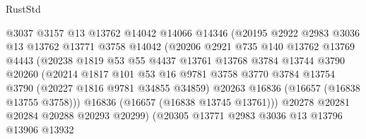 \begin{lexlean}{RustStd}
\begin{coremodule}
                            @3037
                            @3157
                            @13
                            @13762
                            @14042
                            @14066
                            @14346
                            (@20195
                              @2922
                              @2983
                              @3036
                              @13
                              @13762
                              @13771
                              @3758
                              @14042
                              (@20206
                                @2921
                                @735
                                @140
                                @13762
                                @13769
                                @4443
                                (@20238
                                  @1819
                                  @53
                                  @55
                                  @4437
                                  @13761
                                  @13768
                                  @3784
                                  @13744
                                  @3790
                                  @20260
                                  (@20214
                                    @1817
                                    @101
                                    @53
                                    @16
                                    @9781
                                    @3758
                                    @3770
                                    @3784
                                    @13754
                                    @3790
                                    (@20227 @1816 @9781 @34855 @34859)
                                    @20263
                                    @16836
                                    (@16657 (@16838 @13755 @3758)))
                                  @16836
                                  (@16657 (@16838 @13745 @13761)))
                                @20278
                                @20281
                                @20284
                                @20288
                                @20293
                                @20299)
                              (@20305
                                @13771
                                @2983
                                @3036
                                @13
                                @13796
                                @13906
                                @13932

\end{coremodule}
\end{lexlean}
